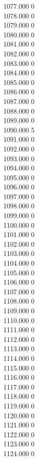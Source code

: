 { 1077.000	0 \\
 1078.000	0 \\
 1079.000	0 \\
 1080.000	0 \\
 1081.000	0 \\
 1082.000	0 \\
 1083.000	0 \\
 1084.000	0 \\
 1085.000	0 \\
 1086.000	0 \\
 1087.000	0 \\
 1088.000	0 \\
 1089.000	0 \\
 1090.000	5 \\
 1091.000	0 \\
 1092.000	0 \\
 1093.000	0 \\
 1094.000	0 \\
 1095.000	0 \\
 1096.000	0 \\
 1097.000	0 \\
 1098.000	0 \\
 1099.000	0 \\
 1100.000	0 \\
 1101.000	0 \\
 1102.000	0 \\
 1103.000	0 \\
 1104.000	0 \\
 1105.000	0 \\
 1106.000	0 \\
 1107.000	0 \\
 1108.000	0 \\
 1109.000	0 \\
 1110.000	0 \\
 1111.000	0 \\
 1112.000	0 \\
 1113.000	0 \\
 1114.000	0 \\
 1115.000	0 \\
 1116.000	0 \\
 1117.000	0 \\
 1118.000	0 \\
 1119.000	0 \\
 1120.000	0 \\
 1121.000	0 \\
 1122.000	0 \\
 1123.000	0 \\
 1124.000	0 \\
}
